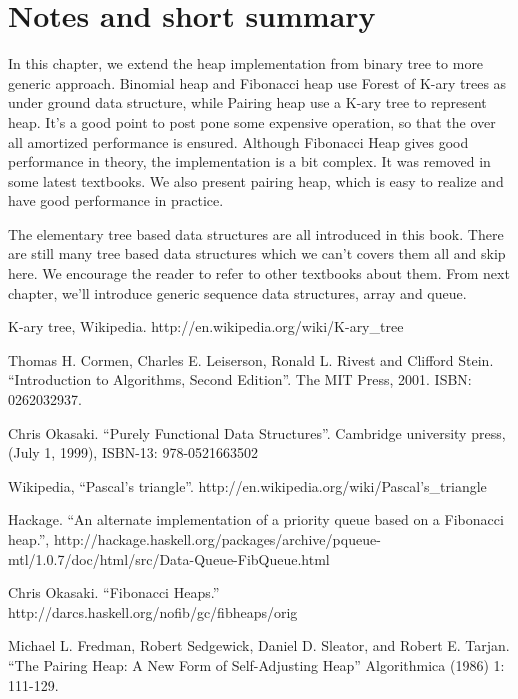 \documentclass{article}
\begin{document}
\section{Notes and short summary}

In this chapter, we extend the heap implementation from binary tree to
more generic approach. Binomial heap and Fibonacci heap use Forest of
K-ary trees as under ground data structure, while Pairing heap use
a K-ary tree to represent heap. It's a good point to post pone some
expensive operation, so that the over all amortized performance is
ensured. Although Fibonacci Heap gives good performance in theory, the
implementation is a bit complex. It was removed in some latest textbooks.
We also present pairing heap, which is easy to realize and have good
performance in practice.

The elementary tree based data structures are all introduced in this
book. There are still many tree based data structures which we can't
covers them all and skip here. We encourage the reader to refer to
other textbooks about them. From next chapter, we'll introduce generic
sequence data structures, array and queue.


\begin{thebibliography}{99}

K-ary tree, Wikipedia. http://en.wikipedia.org/wiki/K-ary\_tree

Thomas H. Cormen, Charles E. Leiserson, Ronald L. Rivest and Clifford Stein. ``Introduction to Algorithms, Second Edition''. The MIT Press, 2001. ISBN: 0262032937.

Chris Okasaki. ``Purely Functional Data Structures''. Cambridge university press, (July 1, 1999), ISBN-13: 978-0521663502

Wikipedia, ``Pascal's triangle''. http://en.wikipedia.org/wiki/Pascal's\_triangle

Hackage. ``An alternate implementation of a priority queue based on a Fibonacci heap.'', http://hackage.haskell.org/packages/archive/pqueue-mtl/1.0.7/doc/html/src/Data-Queue-FibQueue.html

Chris Okasaki. ``Fibonacci Heaps.'' http://darcs.haskell.org/nofib/gc/fibheaps/orig

Michael L. Fredman, Robert Sedgewick, Daniel D. Sleator, and Robert E. Tarjan. ``The Pairing Heap: A New Form of Self-Adjusting Heap'' Algorithmica (1986) 1: 111-129.

\end{thebibliography}

\ifx\wholebook\relax \else
\end{document}
